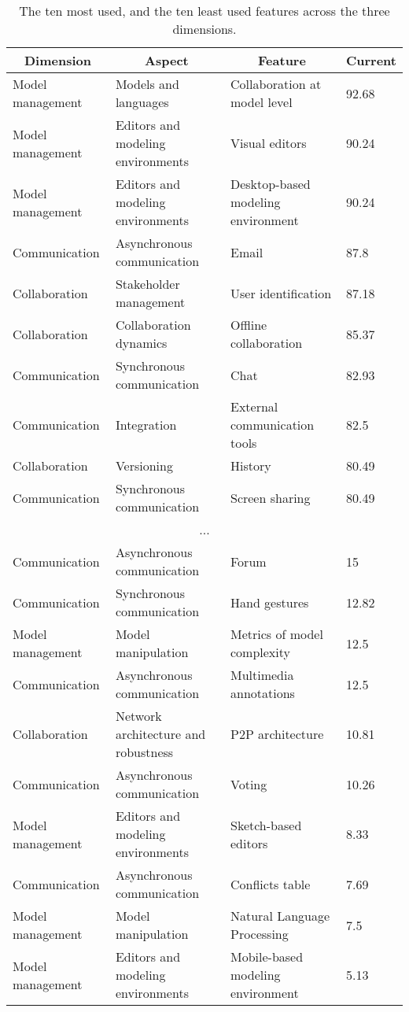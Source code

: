 
  \begin{table*}[]
  \centering
  \notsotiny
  \caption{ The ten most used, and the ten least used features across the three dimensions.}
\label{tab:top-bottom-current}
\begin{tabular}{@{}llll@{}}
  \toprule
\multicolumn{1}{c}{\textbf{Dimension}} & \multicolumn{1}{c}{\textbf{Aspect}} & \multicolumn{1}{c}{\textbf{Feature}} & \multicolumn{1}{c}{\textbf{Current}} \\ 

  \midrule
  Model management & Models and languages & Collaboration at model level & 92.68 \\ 
Model management & Editors and modeling environments & Visual editors & 90.24 \\ 
Model management & Editors and modeling environments & Desktop-based modeling environment & 90.24 \\ 
Communication & Asynchronous communication & Email & 87.8 \\ 
Collaboration & Stakeholder management & User identification & 87.18 \\ 
Collaboration & Collaboration dynamics & Offline collaboration & 85.37 \\ 
Communication & Synchronous communication & Chat & 82.93 \\ 
Communication & Integration & External communication tools & 82.5 \\ 
Collaboration & Versioning & History & 80.49 \\ 
Communication & Synchronous communication & Screen sharing & 80.49 \\ 
\multicolumn{4}{c}{...} \\ 
Communication & Asynchronous communication & Forum & 15 \\ 
Communication & Synchronous communication & Hand gestures & 12.82 \\ 
Model management & Model manipulation & Metrics of model complexity & 12.5 \\ 
Communication & Asynchronous communication & Multimedia annotations & 12.5 \\ 
Collaboration & Network architecture and robustness & P2P architecture & 10.81 \\ 
Communication & Asynchronous communication & Voting & 10.26 \\ 
Model management & Editors and modeling environments & Sketch-based editors & 8.33 \\ 
Communication & Asynchronous communication & Conflicts table & 7.69 \\ 
Model management & Model manipulation & Natural Language Processing & 7.5 \\ 
Model management & Editors and modeling environments & Mobile-based modeling environment & 5.13 \\ 
\bottomrule
  \end{tabular}%
  \end{table*}